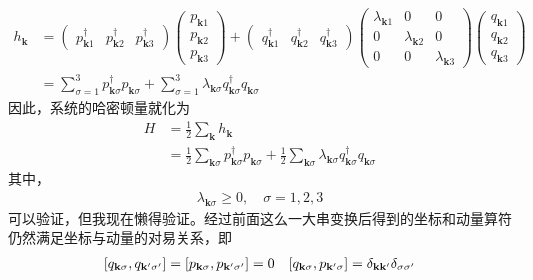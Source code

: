 \begin{equation}
    \begin{aligned} 
    h_\mathbf{k} &=  \left(\begin{array}{ccc}
        p_{\mathbf{k}1}^\dagger  & p_{\mathbf{k}2}^\dagger  &p_{\mathbf{k}3}^\dagger 
  \end{array}\right) \left(\begin{array}{c}
      p_{\mathbf{k}1} \\
      p_{\mathbf{k}2} \\
      p_{\mathbf{k}3}
        \end{array}\right)+ \left(\begin{array}{ccc}
          q_{\mathbf{k}1}^\dagger  & q_{\mathbf{k}2}^\dagger  &q_{\mathbf{k}3}^\dagger 
    \end{array}\right) \left(\begin{array}{ccc}
        \lambda_{\mathbf{k}1 } &  0 & 0 \\
        0 & \lambda_{\mathbf{k}2 }  & 0 \\
        0 & 0 & \lambda_{\mathbf{k}3 } 
          \end{array}\right)
    \left(\begin{array}{c}
        q_{\mathbf{k}1} \\
        q_{\mathbf{k}2} \\
        q_{\mathbf{k}3}
          \end{array}\right) \\
          &= \sum_{\sigma = 1}^3 p^\dagger_{\mathbf{k}\sigma }p_{\mathbf{k}\sigma }
           + \sum_{\sigma = 1}^3 \lambda_{\mathbf{k}\sigma }q_{\mathbf{k}\sigma }^\dagger q_{\mathbf{k}\sigma }
    \end{aligned} 
\end{equation}
因此，系统的哈密顿量就化为
\begin{equation}
    \begin{aligned} 
    H &= \frac{1}{2} \sum_\mathbf{k} h_\mathbf{k} \\ 
    &= \frac{1}{2}\sum_{\mathbf{k}\sigma } p^\dagger_{\mathbf{k}\sigma }p_{\mathbf{k}\sigma }
    +\frac{1}{2} \sum_{\mathbf{k}\sigma} \lambda_{\mathbf{k}\sigma }q_{\mathbf{k}\sigma }^\dagger q_{\mathbf{k}\sigma }
    \end{aligned} 
\end{equation}
其中，
\begin{equation}
    \begin{aligned} 
    \lambda_{\mathbf{k}\sigma } \ge 0, \quad \sigma = 1,2,3
    \end{aligned} 
\end{equation}
可以验证，但我现在懒得验证。经过前面这么一大串变换后得到的坐标和动量算符仍然满足坐标与动量的对易关系，即
\begin{equation}
    \begin{aligned} 
    \relax [q_{\mathbf{k}\sigma },q_{\mathbf{k'}\sigma' }] = [p_{\mathbf{k}\sigma },p_{\mathbf{k'}\sigma' }] = 0
    \quad [q_{\mathbf{k}\sigma },p_{\mathbf{k'}\sigma }] =\delta_{\mathbf{kk'} }\delta_{\sigma \sigma '}
    \end{aligned} 
\end{equation}
